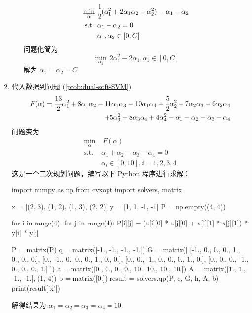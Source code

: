 \documentclass[11pt,letter,notitlepage]{article}
\begin{document}
\begin{solution}
\begin{enumerate}
\begin{enumerate}
$$\begin{aligned}
					            \min_{\alpha}\  & \cfrac{1}{2}(\alpha_1^2+2\alpha_1 \alpha_2 +\alpha_2^2)-\alpha_1-\alpha_2 \\
					            \mbox{s.t. }    & \alpha_1-\alpha_2=0                                                       \\
					                            & \alpha_1,\alpha_2 \in [0,C]
				            \end{aligned}$$
			            问题化简为
			            $$\min_{\alpha_1}\ 2\alpha_1^2-2\alpha_1, \alpha_1\in[0,C]$$
			            解为 $\alpha_1=\alpha_2=C$
		      \end{enumerate}
		\item 代入数据到问题 (\ref{prob:dual-soft-SVM})
		      $$\begin{aligned}
				      F(\alpha)
				      =\cfrac{13}{2}\alpha_1^2+8\alpha_1\alpha_2 -11\alpha_1\alpha_3 -10\alpha_1\alpha_4
				      +\cfrac{5}{2}\alpha_2^2-7\alpha_2\alpha_3 -6\alpha_2\alpha_4 \\
				      +5\alpha_3^2+8\alpha_3\alpha_4
				      +4\alpha_4^2
				      -\alpha_1-\alpha_2-\alpha_3-\alpha_4
			      \end{aligned}$$
		      问题变为
		      $$\begin{aligned}
				      \min_{\alpha} & \ F(\alpha)                             \\
				      \mbox{s.t. }  & \alpha_1+\alpha_2 -\alpha_3 -\alpha_4=0 \\
				                    & \alpha_i \in [0,10], i=1,2,3,4
			      \end{aligned}$$
		      这是一个二次规划问题，编写以下 Python 程序进行求解：
		      \begin{python}
			      import numpy as np
			      from cvxopt import solvers, matrix

			      x = [(2, 3), (1, 2), (1, 3), (2, 2)]
			      y = [1, 1, -1, -1]
			      P = np.empty((4, 4))

			      for i in range(4):
			      for j in range(4):
			      P[i][j] = (x[i][0] * x[j][0] + x[i][1] * x[j][1]) * y[i] * y[j]

			      P = matrix(P)
			      q = matrix([-1., -1., -1., -1.])
			      G = matrix([
					      [-1., 0., 0., 0., 1., 0., 0., 0.],
					      [0., -1., 0., 0., 0., 1., 0., 0.],
					      [0., 0., -1., 0., 0., 0., 1., 0.],
					      [0., 0., 0., -1., 0., 0., 0., 1.]
				      ])
			      h = matrix([0., 0., 0., 0., 10., 10., 10., 10.])
			      A = matrix([1., 1., -1., -1.], (1, 4))
			      b = matrix([0.])
			      result = solvers.qp(P, q, G, h, A, b)
			      print(result['x'])
		      \end{python}
		      解得结果为 $\alpha_1=\alpha_2=\alpha_3=\alpha_4=10$.

	\end{enumerate}
\end{solution}


\end{document}
